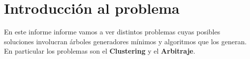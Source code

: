 \documentclass[8pt,a4paper]{article}
\begin{document}

\fecha{\today}



\maketitle

\newpage
%

\section{Introducción al problema}
En este informe informe vamos a ver distintos problemas cuyas posibles soluciones involucran árboles generadores mínimos y algoritmos que los generan. En particular los problemas son el \textbf{Clustering} y el \textbf{Arbitraje}.
\end{document}
